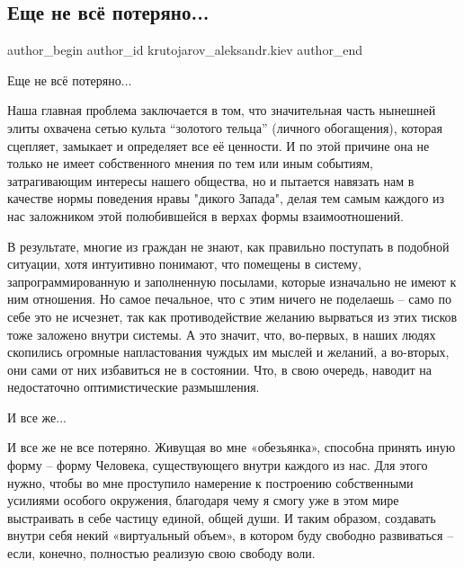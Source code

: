  
 
 
 
 
 
\subsection{Еще не всё потеряно...}
\label{sec:19_08_2021.fb.krutojarov_aleksandr.kiev.1.esche_ne_vse_poterjano}
 
\ifcmt
 author_begin
   author_id krutojarov_aleksandr.kiev
 author_end
\fi

Еще не всё потеряно...

Наша главная проблема заключается в том, что значительная часть нынешней элиты
охвачена сетью культа \enquote{золотого тельца} (личного обогащения), которая сцепляет,
замыкает и определяет все её ценности. И по этой причине она не только не имеет
собственного мнения по тем или иным событиям, затрагивающим интересы нашего
общества, но и пытается навязать нам в качестве нормы поведения нравы "дикого
Запада", делая тем самым каждого из нас заложником этой полюбившейся в верхах
формы взаимоотношений.  

В результате, многие из граждан не знают, как правильно поступать в подобной
ситуации, хотя интуитивно понимают, что помещены в систему, запрограммированную
и заполненную посылами, которые изначально не имеют к ним отношения. Но самое
печальное, что с этим ничего не поделаешь – само по себе это не исчезнет, так
как противодействие желанию вырваться из этих тисков тоже заложено внутри
системы. А это значит, что, во-первых, в наших людях скопились огромные
напластования чуждых им мыслей и желаний, а во-вторых, они сами от них
избавиться не в состоянии. Что, в свою очередь, наводит на недостаточно
оптимистические размышления.

И все же... 

И все же не все потеряно. Живущая во мне «обезьянка», способна принять иную
форму – форму Человека, существующего внутри каждого из нас. Для этого нужно,
чтобы во мне проступило намерение к построению собственными усилиями особого
окружения, благодаря чему я смогу уже в этом мире выстраивать в себе частицу
единой, общей души. И таким образом, создавать внутри себя некий «виртуальный
объем», в котором буду свободно развиваться – если, конечно, полностью реализую
свою свободу воли.

